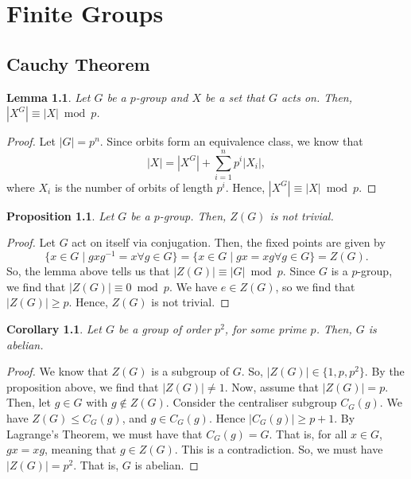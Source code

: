 \documentclass[a4paper, openany]{memoir}
\theoremstyle{definition}
\theoremstyle{plain}
\newtheorem{lemma}[definition]{Lemma}
\newtheorem{proposition}[definition]{Proposition}
\newtheorem{corollary}[definition]{Corollary}
\begin{document}
    \chapter{Finite Groups}
    \section{Cauchy Theorem}

    \begin{lemma}
        Let $G$ be a $p$-group and $X$ be a set that $G$ acts on. Then, $|X^G| \equiv |X| \bmod{p}$.
    \end{lemma}
    \begin{proof}
        Let $|G| = p^n$. Since orbits form an equivalence class, we know that
        \[|X| = |X^G| + \sum_{i=1}^n p^i |X_i|,\]
        where $X_i$ is the number of orbits of length $p^i$. Hence, $|X^G| \equiv |X| \bmod{p}$.
    \end{proof}

    \begin{proposition}
        Let $G$ be a $p$-group. Then, $Z(G)$ is not trivial.
    \end{proposition}
    \begin{proof}
        Let $G$ act on itself via conjugation. Then, the fixed points are given by
        \[\{x \in G \mid gxg^{-1} = x \forall g \in G\} = \{x \in G \mid gx = xg \forall g \in G\} = Z(G).\]
        So, the lemma above tells us that $|Z(G)| \equiv |G| \bmod{p}$. Since $G$ is a $p$-group, we find that $|Z(G)| \equiv 0 \bmod{p}$. We have $e \in Z(G)$, so we find that $|Z(G)| \geq p$. Hence, $Z(G)$ is not trivial.
    \end{proof}

    \begin{corollary}
        Let $G$ be a group of order $p^2$, for some prime $p$. Then, $G$ is abelian.
    \end{corollary}
    \begin{proof}
        We know that $Z(G)$ is a subgroup of $G$. So, $|Z(G)| \in \{1, p, p^2\}$. By the proposition above, we find that $|Z(G)| \neq 1$. Now, assume that $|Z(G)| = p$. Then, let $g \in G$ with $g \not\in Z(G)$. Consider the centraliser subgroup $C_G(g)$. We have $Z(G) \leq C_G(g)$, and $g \in C_G(g)$. Hence $|C_G(g)| \geq p + 1$. By Lagrange's Theorem, we must have that $C_G(g) = G$. That is, for all $x \in G$, $gx = xg$, meaning that $g \in Z(G)$. This is a contradiction. So, we must have $|Z(G)| = p^2$. That is, $G$ is abelian.
    \end{proof}
\end{document}

